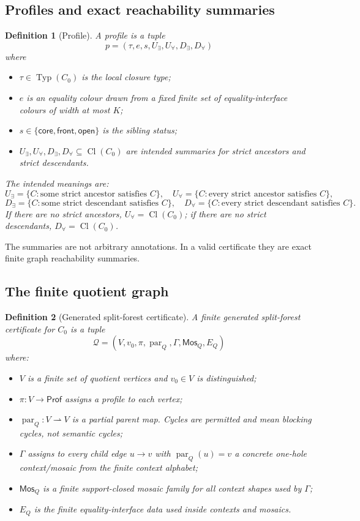 \documentclass[11pt]{article}
\newtheorem{definition}{Definition}[section]
\theoremstyle{remark}
\newcommand{\Cl}{\operatorname{Cl}}
\newcommand{\Typ}{\operatorname{Typ}}
\newcommand{\Prof}{\mathsf{Prof}}
\newcommand{\Mos}{\mathsf{Mos}}
\newcommand{\parr}{\operatorname{par}}
\newcommand{\core}{\mathsf{core}}
\newcommand{\front}{\mathsf{front}}
\newcommand{\open}{\mathsf{open}}
\newcommand{\Q}{\mathcal{Q}}
\begin{document}
\subsection{Profiles and exact reachability summaries}
\begin{definition}[Profile]
A profile is a tuple
\[
p=(\tau,e,s,U_\exists,U_\forall,D_\exists,D_\forall)
\]
where
\begin{itemize}
\item $\tau\in\Typ(C_0)$ is the local closure type;
\item $e$ is an equality colour drawn from a fixed finite set of equality-interface colours of width at most $K$;
\item $s\in\{\core,\front,\open\}$ is the sibling status;
\item $U_\exists,U_\forall,D_\exists,D_\forall\subseteq\Cl(C_0)$ are intended summaries for strict ancestors and strict descendants.
\end{itemize}
The intended meanings are:
\[
U_\exists=\{C:\text{some strict ancestor satisfies }C\},
\quad
U_\forall=\{C:\text{every strict ancestor satisfies }C\},
\]
\[
D_\exists=\{C:\text{some strict descendant satisfies }C\},
\quad
D_\forall=\{C:\text{every strict descendant satisfies }C\}.
\]
If there are no strict ancestors, $U_\forall=\Cl(C_0)$; if there are no strict descendants, $D_\forall=\Cl(C_0)$.
\end{definition}

The summaries are not arbitrary annotations.  In a valid certificate they are exact finite graph reachability summaries.

\subsection{The finite quotient graph}
\begin{definition}[Generated split-forest certificate]
A finite generated split-forest certificate for $C_0$ is a tuple
\[
\Q=(V,v_0,\pi,\parr_Q,\Gamma,\Mos_Q,E_Q)
\]
where:
\begin{itemize}
\item $V$ is a finite set of quotient vertices and $v_0\in V$ is distinguished;
\item $\pi:V\to\Prof$ assigns a profile to each vertex;
\item $\parr_Q:V\rightharpoonup V$ is a partial parent map.  Cycles are permitted and mean blocking cycles, not semantic cycles;
\item $\Gamma$ assigns to every child edge $u\to v$ with $\parr_Q(u)=v$ a concrete one-hole context/mosaic from the finite context alphabet;
\item $\Mos_Q$ is a finite support-closed mosaic family for all context shapes used by $\Gamma$;
\item $E_Q$ is the finite equality-interface data used inside contexts and mosaics.
\end{itemize}
\end{definition}
\end{document}
